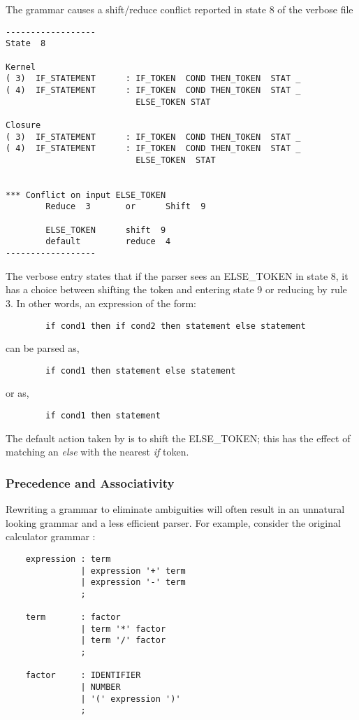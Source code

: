 The grammar causes a shift/reduce conflict reported in state
8 of the verbose file

\begin{verbatim}
------------------
State  8

Kernel
( 3)  IF_STATEMENT      : IF_TOKEN  COND THEN_TOKEN  STAT _
( 4)  IF_STATEMENT      : IF_TOKEN  COND THEN_TOKEN  STAT _
                          ELSE_TOKEN STAT

Closure
( 3)  IF_STATEMENT      : IF_TOKEN  COND THEN_TOKEN  STAT _
( 4)  IF_STATEMENT      : IF_TOKEN  COND THEN_TOKEN  STAT _
                          ELSE_TOKEN  STAT


*** Conflict on input ELSE_TOKEN
        Reduce  3       or      Shift  9

        ELSE_TOKEN      shift  9
        default         reduce  4
------------------
\end{verbatim}

The verbose entry states that if the parser sees an ELSE\_TOKEN in state 8,
it has a choice between shifting the token and entering state 9 or reducing
by rule 3.  In other words, an expression of the form:

\begin{verbatim}
        if cond1 then if cond2 then statement else statement

\end{verbatim}
can be parsed as,
\begin{verbatim}
        if cond1 then statement else statement
\end{verbatim}
or as,
\begin{verbatim}
        if cond1 then statement

\end{verbatim}

The default action taken by \ayacc is to shift the ELSE\_TOKEN;
this has the effect of matching an {\it else} with the nearest {\it if}
token.
\subsubsection{Precedence and Associativity}
Rewriting a grammar to eliminate ambiguities will often result
in an unnatural looking grammar and a less efficient parser.  For example,
consider the original calculator grammar :
\begin{verbatim}
    expression : term
               | expression '+' term
               | expression '-' term
               ;

    term       : factor
               | term '*' factor
               | term '/' factor
               ;

    factor     : IDENTIFIER
               | NUMBER
               | '(' expression ')'
               ;

\end{verbatim}


